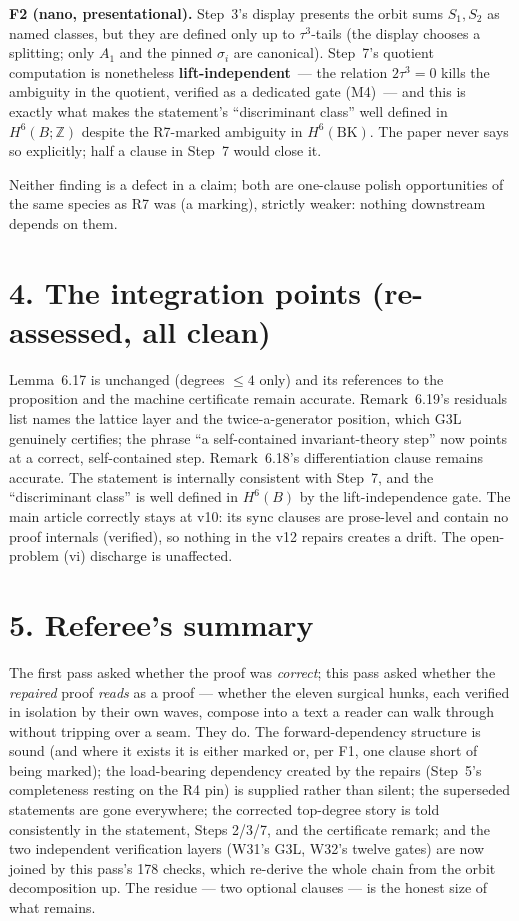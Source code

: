 \documentclass[11pt,a4paper]{article}
\newcommand{\Z}{\mathbb{Z}}
\newcommand{\BK}{\mathrm{BK}}
\begin{document}
\textbf{F2 (nano, presentational).} Step~3's display presents the orbit
sums $S_1,S_2$ as named classes, but they are defined only up to
$\tau^3$-tails (the display chooses a splitting; only $A_1$ and the pinned
$\sigma_i$ are canonical). Step~7's quotient computation is nonetheless
\textbf{lift-independent}~--- the relation $2\tau^3=0$ kills the ambiguity
in the quotient, verified as a dedicated gate (M4)~--- and this is exactly
what makes the statement's ``discrimin\-ant class'' well defined in
$H^6(B;\Z)$ despite the R7-marked ambiguity in $H^6(\BK)$. The paper never
says so explicitly; half a clause in Step~7 would close it.

Neither finding is a defect in a claim; both are one-clause polish
opportunities of the same species as R7 was (a marking), strictly weaker:
nothing downstream depends on them.

\section*{4. The integration points (re-assessed, all clean)}

Lemma~6.17 is unchanged (degrees $\le 4$ only) and its references to the
proposition and the machine certificate remain accurate. Remark~6.19's
residuals list names the lattice layer and the twice-a-generator position,
which G3L genuinely certifies; the phrase ``a self-contained
invariant-theory step'' now points at a correct, self-contained step.
Remark~6.18's differentiation clause remains accurate. The statement is
internally consistent with Step~7, and the ``discriminant class'' is well
defined in $H^6(B)$ by the lift-independence gate. The main article
correctly stays at v10: its sync clauses are prose-level and contain no
proof internals (verified), so nothing in the v12 repairs creates a drift.
The open-problem (vi) discharge is unaffected.

\section*{5. Referee's summary}

The first pass asked whether the proof was \emph{correct}; this pass asked
whether the \emph{repaired} proof \emph{reads} as a proof --- whether the
eleven surgical hunks, each verified in isolation by their own waves,
compose into a text a reader can walk through without tripping over a
seam. They do. The forward-dependency structure is sound (and where it
exists it is either marked or, per F1, one clause short of being marked);
the load-bearing dependency created by the repairs (Step~5's completeness
resting on the R4 pin) is supplied rather than silent; the superseded
statements are gone everywhere; the corrected top-degree story is told
consistently in the statement, Steps 2/3/7, and the certificate remark;
and the two independent verification layers (W31's G3L, W32's twelve
gates) are now joined by this pass's 178 checks, which re-derive the whole
chain from the orbit decomposition up. The residue --- two optional
clauses --- is the honest size of what remains.
\end{document}
